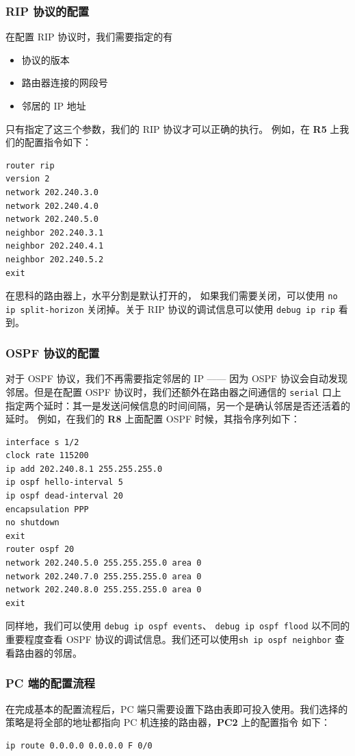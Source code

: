 \documentclass[black,normal,cn]{elegantnote}
\begin{document}
\subsubsection{RIP 协议的配置}

在配置 RIP 协议时，我们需要指定的有
\begin{itemize}
    \item 协议的版本
    \item 路由器连接的网段号
    \item 邻居的 IP 地址
\end{itemize}
只有指定了这三个参数，我们的 RIP 协议才可以正确的执行。
例如，在 \textbf{R5} 上我们的配置指令如下：
\begin{lstlisting}
router rip
version 2
network 202.240.3.0
network 202.240.4.0
network 202.240.5.0
neighbor 202.240.3.1
neighbor 202.240.4.1
neighbor 202.240.5.2
exit
\end{lstlisting}

在思科的路由器上，水平分割是默认打开的，
如果我们需要关闭，可以使用 \texttt{no ip split-horizon}
关闭掉。关于 RIP 协议的调试信息可以使用 \texttt{debug ip rip} 看到。
\subsubsection{OSPF 协议的配置}
对于 OSPF 协议，我们不再需要指定邻居的 IP —— 因为 OSPF 协议会自动发现
邻居。但是在配置 OSPF 协议时，我们还额外在路由器之间通信的 \texttt{serial}
口上指定两个延时：其一是发送问候信息的时间间隔，另一个是确认邻居是否还活着的延时。
例如，在我们的 \textbf{R8} 上面配置 OSPF 时候，其指令序列如下：
\begin{lstlisting}
interface s 1/2
clock rate 115200
ip add 202.240.8.1 255.255.255.0
ip ospf hello-interval 5
ip ospf dead-interval 20
encapsulation PPP
no shutdown
exit
router ospf 20
network 202.240.5.0 255.255.255.0 area 0
network 202.240.7.0 255.255.255.0 area 0
network 202.240.8.0 255.255.255.0 area 0
exit
\end{lstlisting}

同样地，我们可以使用 \texttt{debug ip ospf events}、
\texttt{debug ip ospf flood} 以不同的重要程度查看
 OSPF 协议的调试信息。我们还可以使用\texttt{sh ip ospf neighbor}
查看路由器的邻居。

\subsubsection{PC 端的配置流程}
在完成基本的配置流程后，PC 端只需要设置下路由表即可投入使用。我们选择的
策略是将全部的地址都指向 PC 机连接的路由器，\textbf{PC2} 上的配置指令
如下：
\begin{lstlisting}
ip route 0.0.0.0 0.0.0.0 F 0/0
\end{lstlisting}
\end{document}
